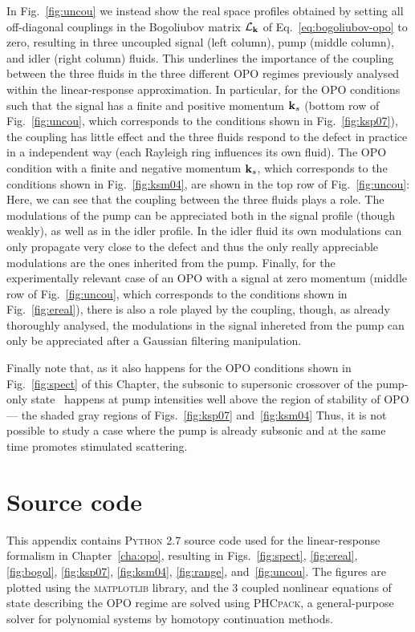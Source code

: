 \begin{subappendices}
In Fig.~\ref{fig:uncou} we instead show the real space profiles
obtained by setting all off-diagonal couplings in the Bogoliubov
matrix $\mathcal{L}_{\mathbf{k}}$ of Eq.~\eqref{eq:bogoliubov-opo} to
zero, resulting in three uncoupled signal (left column), pump (middle
column), and idler (right column) fluids. This underlines the
importance of the coupling between the three fluids in the three
different OPO regimes previously analysed within the linear-response
approximation. In particular, for the OPO conditions such that the
signal has a finite and positive momentum $\mathbf{k}_s$ (bottom row of
Fig.~\ref{fig:uncou}, which corresponds to the conditions shown in
Fig.~\ref{fig:ksp07}), the coupling has little effect and the three
fluids respond to the defect in practice in a independent way (each
Rayleigh ring influences its own fluid). The OPO condition with a
finite and negative momentum $\mathbf{k}_s$, which corresponds to the
conditions shown in Fig.~\ref{fig:ksm04}, are shown in the top row of
Fig.~\ref{fig:uncou}: Here, we can see that the coupling between the
three fluids plays a role. The modulations of the pump can be
appreciated both in the signal profile (though weakly), as well as in
the idler profile. In the idler fluid its own modulations can only
propagate very close to the defect and thus the only really
appreciable modulations are the ones inherited from the pump. Finally,
for the experimentally relevant case of an OPO with a signal at zero
momentum (middle row of Fig.~\ref{fig:uncou}, which corresponds to the
conditions shown in Fig.~\ref{fig:ereal}), there is also a role played
by the coupling, though, as already thoroughly analysed, the
modulations in the signal inhereted from the pump can only be
appreciated after a Gaussian filtering manipulation.


Finally note that, as it also happens for the OPO conditions shown in
Fig.~\ref{fig:spect} of this Chapter, the subsonic to supersonic
crossover of the pump-only state~\cite{Amo_2009} happens at pump
intensities well above the region of stability of OPO --- the shaded
gray regions of Figs.~\ref{fig:ksp07} and~\ref{fig:ksm04} Thus, it is
not possible to study a case where the pump is already subsonic and at
the same time promotes stimulated scattering.

\section{Source code}\label{sec:source-code-opo}
%
This appendix contains \textsc{Python} 2.7 source code used for the
linear-response formalism in Chapter~\ref{cha:opo}, resulting in
Figs.~\ref{fig:spect}, \ref{fig:ereal}, \ref{fig:bogol},
\ref{fig:ksp07}, \ref{fig:ksm04}, \ref{fig:range},
and~\ref{fig:uncou}. The figures are plotted using the
\textsc{matplotlib} library, and the 3 coupled nonlinear equations of
state describing the OPO regime are solved using \textsc{PHCpack}, a
general-purpose solver for polynomial systems by homotopy continuation
methods.
%

\end{subappendices}

